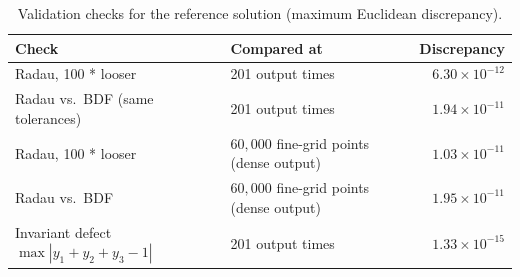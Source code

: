 \begin{table}[H]
\centering
\caption{Validation checks for the reference solution (maximum Euclidean discrepancy).}
\label{tab:reference}
\small
\begin{tabular}{@{}llr@{}}
\toprule
Check & Compared at & Discrepancy\\
\midrule
Radau, 100 * looser & 201 output times & $6.30\times10^{-12}$\\
Radau vs.\ BDF (same tolerances) & 201 output times & $1.94\times10^{-11}$\\
Radau, 100 * looser & $60{,}000$ fine-grid points (dense output) & $1.03\times10^{-11}$\\
Radau vs.\ BDF & $60{,}000$ fine-grid points (dense output) & $1.95\times10^{-11}$\\
Invariant defect $\max|y_1+y_2+y_3-1|$ & 201 output times & $1.33\times10^{-15}$\\
\bottomrule
\end{tabular}
\end{table}

